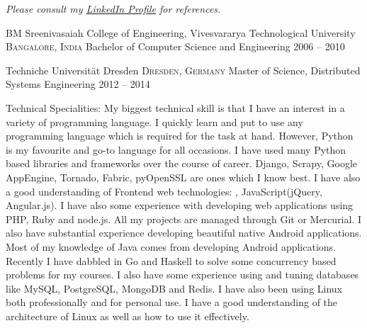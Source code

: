 \documentclass[10pt,a4paper]{article}
\begin{document}
\begin{center}
  \emph{Please consult my \href{https://de.linkedin.com/in/arnaik}{LinkedIn Profile} for references.}
\end{center}


\spacedhrule{-0.2em}{-0.4em}


\headedsection
  {BM Sreenivasaiah College of Engineering, Vivesvararya Technological University}
  {\textsc{Bangalore, India}} {%
  \headedsubsection
    {Bachelor of Computer Science and Engineering}
    {2006 -- 2010}
    {}
}

\headedsection
  {Techniche Universit{\"a}t Dresden}
  {\textsc{Dresden, Germany}} {%
  \headedsubsection
    {Master of Science, Distributed Systems Engineering}
    {2012 -- 2014}
    {}
}


\spacedhrule{0.5em}{-0.4em}


\inlineheadsection  %
  {Technical Specialities:}
  {My biggest technical skill is that I have an interest in a variety of programming language. I quickly learn and put to use any programming language which is required for the task at hand. However, Python is my favourite and go-to language for all occasions. I have used many Python based libraries and frameworks over the course of career. Django, Scrapy, Google AppEngine, Tornado, Fabric, pyOpenSSL are ones which I know best. I have also a good understanding of Frontend web technologies: , JavaScript(jQuery, Angular.js). I have also some experience with developing web applications using PHP, Ruby and node.js. All my projects are managed through Git or Mercurial. I also have substantial experience developing beautiful native Android applications. Most of my knowledge of Java comes from developing Android applications. Recently I have dabbled in Go and Haskell to solve some concurrency based problems for my courses. I also have some experience using and tuning databases like MySQL, PostgreSQL, MongoDB and Redis. I have also been using Linux both professionally and for personal use. I have a good understanding of the architecture of Linux as well as how to use it effectively.
}
\end{document}
